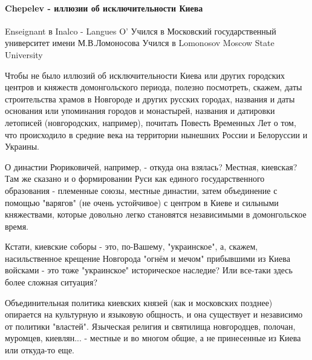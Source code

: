 
 
 
 
 
\paragraph{Chepelev - иллюзии об исключительности Киева}
\label{sec:14_07_2021.fb.krjukova_svetlana.1.statja_putina_mnenie.cmt.chepelev_kiev_illjuzii}

\begin{itemize}
Enseignant в Inalco - Langues O'
Учился в Московский государственный университет имени М.В.Ломоносова
Учился в Lomonosov Moscow State University
\par

Чтобы не было иллюзий об исключительности Киева или других городских центров и
княжеств домонгольского периода, полезно посмотреть, скажем, даты строительства
храмов в Новгороде и других русских городах, названия и даты основания или
упоминания городов и монастырей, названия и датировки летописей (новгородских,
например), почитать Повесть Временных Лет о том, что происходило в средние века
на территории нынешних России и Белоруссии и Украины. 

О династии Рюриковичей, например, - откуда она взялась? Местная, киевская? Там
же сказано и о формировании Руси как единого государственного образования -
племенные союзы, местные династии, затем объединение с помощью "варягов" (не
очень устойчивое) с центром в Киеве и сильными княжествами, которые довольно
легко становятся независимыми в домонгольское время. 

Кстати, киевские соборы - это, по-Вашему, "украинское", а, скажем,
насильственное крещение Новгорода "огнём и мечом" прибывшими из Киева войсками
- это тоже "украинское" историческое наследие? Или все-таки здесь более сложная
ситуация? 

Объединительная политика киевских князей (как и московских позднее) опирается
на культурную и языковую общность, и она существует и независимо от политики
"властей". Языческая религия и святилища новгородцев, полочан, муромцев,
киевлян... - местные и во многом общие, а не принесенные из Киева или откуда-то
еще.


\end{itemize}
